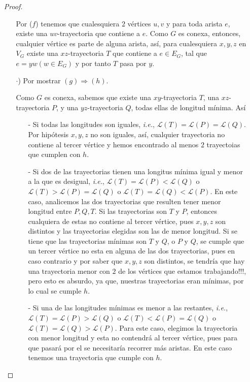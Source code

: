 \documentclass{article}
\begin{document}
\begin{enumerate}
\begin{proof}
\begin{itemize}
      Por ($f$) tenemos que cualesquiera $2$ vértices $u, v$ y para
      toda arista $e$, existe una $uv$-trayectoria que contiene a $e$.
      Como $G$ es conexa, entonces, cualquier vértice es parte de alguna
      arista, así, para cualesquiera $x, y, z$ en $V_G$ existe una
      $xz$-trayectoria $T$ que contiene a $e \in E_G$, tal que $e =
      yw (w \in E_G)$ y por tanto $T$ pasa por $y$.
    \item[$\cdot$)] Por mostrar $(g) \Rightarrow (h)$.
      
      Como $G$ es conexa, sabemos que existe una $xy$-trayectoria $T$,
      una $xz$-trayectoria $P$, y una $yz$-trayectoria $Q$, todas ellas
      de longitud mínima. Así
      \begin{itemize}
      \item[-] Si todas las longitudes son iguales, \textit{i.e.}, $\mathcal{L}(T)
        = \mathcal{L}(P) = \mathcal{L}(Q)$. Por hipótesis $x,y,z$ no son iguales,
        así, cualquier trayectoria no contiene al tercer vértice y hemos encontrado
        al menos $2$ trayectoias que cumplen con $h$.
        
      \item[-] Si dos de las trayectorias tienen una longitus mínima igual y menor
        a la que es desigual, \textit{i.e.}, $\mathcal{L}(T) = \mathcal{L}(P) < \mathcal{L}(Q)$
        o $\mathcal{L}(T) > \mathcal{L}(P) = \mathcal{L}(Q)$ o $\mathcal{L}(T) = \mathcal{L}(Q)
        < \mathcal{L}(P)$. En este caso, analicemos las dos trayectorias que resulten tener menor
        longitud entre $P, Q, T$. Si las trayectorias son $T$ y $P$, entonces cualquiera de estas
        no contiene al tercer vértice, pues $x,y,z$ son distintos y las trayectorias elegidas son
        las de menor longitud. Si se tiene que las trayectorias mínimas son $T$ y $Q$, o $P$ y $Q$,
        se cumple que un tercer vértice no esta en alguna de las dos trayectorias, pues en caso
        contrario y por saber que $x,y,z$ son distintos, se tendría que  hay una trayectoria menor
        con $2$ de los vértices que estamos trabajando!!!, pero esto es absurdo, ya que, nuestras
        trayectorias eran mínimas, por lo cual se cumple $h$.
        
      \item[-] Si una de las longitudes mínimas es menor a las restantes, \textit{i.e.},
        $\mathcal{L}(T) = \mathcal{L}(P) > \mathcal{L}(Q)$ o $\mathcal{L}(T) < \mathcal{L}(P)
        = \mathcal{L}(Q)$ o $\mathcal{L}(T) = \mathcal{L}(Q) > \mathcal{L}(P)$. Para este caso,
        elegimos la trayectoria con menor longitud y esta no contendrá al tercer vértice, pues
        para que pasará por el se necesitaría recorrer más aristas. En este caso tenemos una
        trayectoria que cumple con $h$.
      \end{itemize}
      

\end{itemize}
\end{proof}
\end{enumerate}
\end{document}
